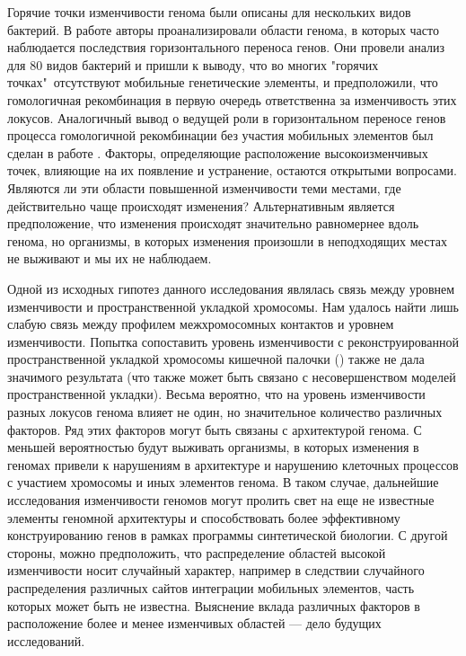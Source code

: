 Горячие точки изменчивости генома были описаны для нескольких видов бактерий. В работе \cite{oliveira2017chromosomal} авторы проанализировали области генома, в которых часто наблюдается последствия горизонтального переноса генов. Они провели анализ для 80 видов бактерий и пришли к выводу, что во многих "горячих точках"\ отсутствуют мобильные генетические элементы, и предположили, что гомологичная рекомбинация в первую очередь ответственна за изменчивость этих локусов. Аналогичный вывод о ведущей роли в горизонтальном переносе генов процесса гомологичной рекомбинации без участия мобильных элементов был сделан в работе \cite{ely2020recombination}. Факторы, определяющие расположение высокоизменчивых точек, влияющие на их появление и устранение, остаются открытыми вопросами. Являются ли эти области повышенной изменчивости теми местами, где действительно чаще происходят изменения? Альтернативным является предположение, что изменения происходят значительно равномернее вдоль генома, но организмы, в которых изменения произошли в неподходящих местах не выживают и мы их не наблюдаем.

Одной из исходных гипотез данного исследования являлась связь между уровнем изменчивости и пространственной укладкой хромосомы. Нам удалось найти лишь слабую связь между профилем межхромосомных контактов и уровнем изменчивости. Попытка сопоставить уровень изменчивости с реконструированной пространственной укладкой хромосомы кишечной палочки (\cite{hacker2017features}) также не дала значимого результата (что также может быть связано с несовершенством моделей пространственной укладки). Весьма вероятно, что на уровень изменчивости разных локусов генома влияет не один, но значительное количество различных факторов. Ряд этих факторов могут быть связаны с архитектурой генома. С меньшей вероятностью будут выживать организмы, в которых изменения в геномах привели к нарушениям в архитектуре и нарушению клеточных процессов с участием хромосомы и иных элементов генома. В таком случае, дальнейшие исследования изменчивости геномов могут пролить свет на еще не известные элементы геномной архитектуры и способствовать более эффективному конструированию генов в рамках программы синтетической биологии. С другой стороны, можно предположить, что распределение областей высокой изменчивости носит случайный характер, например в следствии случайного распределения различных сайтов интеграции мобильных элементов, часть которых может быть не известна. Выяснение вклада различных факторов в расположение более и менее изменчивых областей --- дело будущих исследований. 

